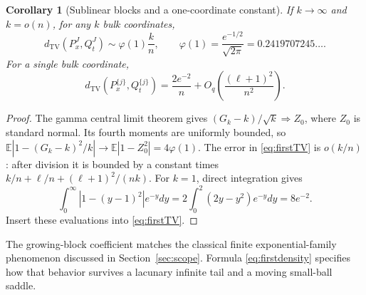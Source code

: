\documentclass[11pt,letterpaper]{article}
\numberwithin{equation}{section}
\newtheorem{corollary}[theorem]{Corollary}
\theoremstyle{definition}
\theoremstyle{remark}
\newcommand{\EE}{\mathbb E}
\newcommand{\TV}{d_{\mathrm{TV}}}
\begin{document}
\begin{corollary}[Sublinear blocks and a one-coordinate constant]
\label{cor:sublinear}
If $k\to\infty$ and $k=o(n)$, for any $k$ bulk coordinates,
\begin{equation}
 \TV(P_x^J,Q_t^J)\sim\varphi(1)\frac{k}{n},\qquad
 \varphi(1)=\frac{e^{-1/2}}{\sqrt{2\pi}}
 =0.2419707245\ldots.
 \label{eq:linearTV}
\end{equation}
For a single bulk coordinate,
\begin{equation}
 \TV(P_x^{\{j\}},Q_t^{\{j\}})
 =\frac{2e^{-2}}{n}+O_q\left(\frac{(\ell+1)^2}{n^2}\right).
 \label{eq:singleTV}
\end{equation}
\end{corollary}
\begin{proof}
The gamma central limit theorem gives $(G_k-k)/\sqrt k\Rightarrow Z_0$,
where $Z_0$ is standard normal. Its fourth moments are uniformly bounded,
so $\EE|1-(G_k-k)^2/k|\to\EE|1-Z_0^2|=4\varphi(1)$.
The error in \eqref{eq:firstTV} is $o(k/n)$: after division it is bounded
by a constant times $k/n+\ell/n+(\ell+1)^2/(nk)$.
For $k=1$, direct integration gives
\[
 \int_0^\infty|1-(y-1)^2|e^{-y}dy
 =2\int_0^2(2y-y^2)e^{-y}dy=8e^{-2}.
\]
Insert these evaluations into \eqref{eq:firstTV}.
\end{proof}

The growing-block coefficient matches the classical finite exponential-family
phenomenon discussed in Section~\ref{sec:scope}. Formula
\eqref{eq:firstdensity} specifies how that behavior survives a lacunary
infinite tail and a moving small-ball saddle.
\end{document}
